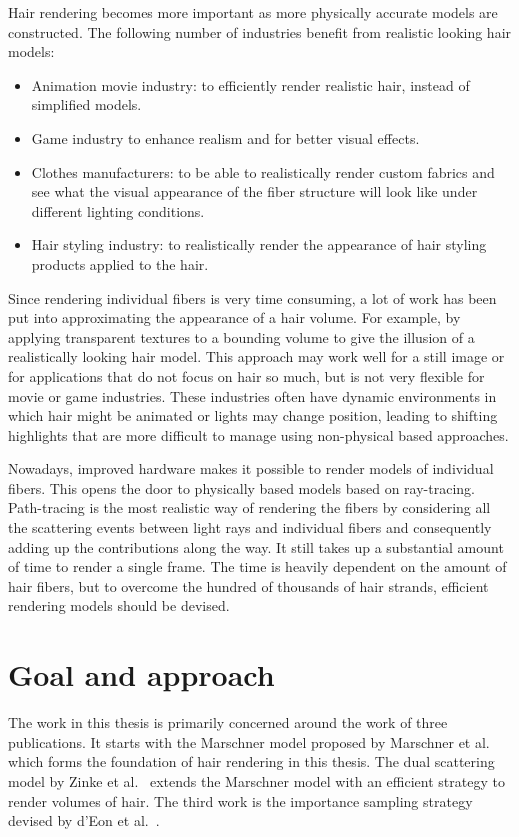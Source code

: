 \documentclass[11pt,a4paper]{report}
\begin{document}
Hair rendering becomes more important as more physically accurate models are constructed. The following number of industries benefit from realistic looking hair models:

\begin{itemize}
\item Animation movie industry: to efficiently render realistic hair, instead of simplified models.
\item Game industry to enhance realism and for better visual effects.
\item Clothes manufacturers: to be able to realistically render custom fabrics and see what the visual appearance of the fiber structure will look like under different lighting conditions.
\item Hair styling industry: to realistically render the appearance of hair styling products applied to the hair.
\end{itemize}

Since rendering individual fibers is very time consuming, a lot of work has been put into approximating the appearance of a hair volume. For example, by applying transparent textures to a bounding volume to give the illusion of a realistically looking hair model. This approach may work well for a still image or for applications that do not focus on hair so much, but is not very flexible for movie or game industries. These industries often have dynamic environments in which hair might be animated or lights may change position, leading to shifting highlights that are more difficult to manage using non-physical based approaches.

Nowadays, improved hardware makes it possible to render models of individual fibers. This opens the door to physically based models based on ray-tracing. Path-tracing is the most realistic way of rendering the fibers by considering all the scattering events between light rays and individual fibers and consequently adding up the contributions along the way. It still takes up a substantial amount of time to render a single frame. The time is heavily dependent on the amount of hair fibers, but to overcome the hundred of thousands of hair strands, efficient rendering models should be devised.


\section{Goal and approach}

The work in this thesis is primarily concerned around the work of three publications. It starts with the Marschner model proposed by Marschner et al.~\cite{marschner} which forms the foundation of hair rendering in this thesis. The dual scattering model by Zinke et al.~\cite{zinke} extends the Marschner model with an efficient strategy to render volumes of hair. The third work is the importance sampling strategy devised by d'Eon et al.~\cite{eon2013}.
\end{document}
